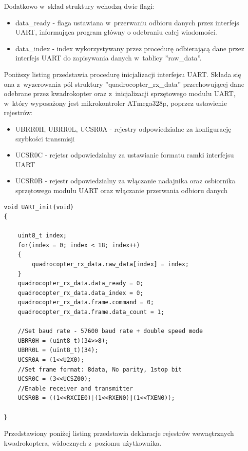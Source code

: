Dodatkowo w~skład struktury wchodzą dwie flagi:
\begin{itemize}
	\item data\_ready - flaga ustawiana w~przerwaniu odbioru danych przez interfejs UART, informująca program główny o odebraniu całej wiadomości.
	\item data\_index - index wykorzystywany przez procedurę odbierającą dane przez interfejs UART do zapisywania danych w~tablicy ''raw\_data''. 
\end{itemize}

Poniższy listing przedstawia procedurę inicjalizacji interfejsu UART. Składa się ona z~wyzerowania pól struktury ''quadrocopter\_rx\_data'' przechowującej dane odebrane przez kwadrokopter oraz z~inicjalizacji sprzętowego modułu UART, w~który wyposażony jest mikrokontroler ATmega328p, poprzez ustawienie rejestrów:
\begin{itemize}
	\item UBRR0H, UBRR0L, UCSR0A - rejestry odpowiedzialne za konfigurację szybkości transmisji
	\item UCSR0C - rejetsr odpowiedzialny za ustawianie formatu ramki interfejsu UART
	\item UCSR0B - rejestr odpowiedzialny za włączanie nadajnika oraz osbiornika sprzętowego modułu UART oraz włączanie przerwania odbioru danych
\end{itemize}

\begin{lstlisting}
void UART_init(void)
{

    uint8_t index;
    for(index = 0; index < 18; index++)
    {
        quadrocopter_rx_data.raw_data[index] = index;
    }
    quadrocopter_rx_data.data_ready = 0;
    quadrocopter_rx_data.data_index = 0;
    quadrocopter_rx_data.frame.command = 0;
    quadrocopter_rx_data.frame.data_count = 1;

	//Set baud rate - 57600 baud rate + double speed mode
	UBRR0H = (uint8_t)(34>>8);
	UBRR0L = (uint8_t)(34);
	UCSR0A = (1<<U2X0);
	//Set frame format: 8data, No parity, 1stop bit
	UCSR0C = (3<<UCSZ00);
	//Enable receiver and transmitter
	UCSR0B = ((1<<RXCIE0)|(1<<RXEN0)|(1<<TXEN0));

}
\end{lstlisting}

Przedstawiony poniżej listing przedstawia deklaracje rejestrów wewnętrznych kwadrokoptera, widocznych z~poziomu użytkownika. 


